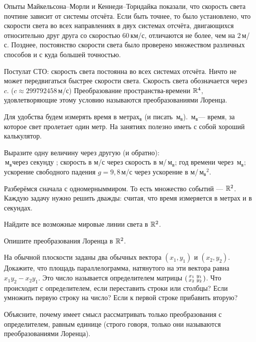 \documentclass[a4paper,12pt]{article}
\newcommand{\smat}[1]{\hr{\begin{smallmatrix}#1\end{smallmatrix}}}
\newcommand{\мв}{\,м$_в$}
\begin{document}

{\tiny
Опыты Майкельсона--Морли и Кеннеди--Торндайка показали, что скорость света  почти не зависит от системы отсчёта. Если быть точнее, то было установлено, что скорости света во всех направлениях в двух системах отсчёта, двигающихся относительно друг друга со скоростью 60\,км/с, отличаются не более, чем на 2\,м/с. Позднее, постоянство скорости света было проверено множеством различных способов и с куда большей точностью.

}{\small
Постулат СТО: скорость света постоянна во всех системах отсчёта. Ничто не может передвигаться быстрее скорости света. Скорость света обозначается через $c$. ($c\approx299 792 458$\,м/с)
Преобразование пространства-времени $\mathbb{R}^4$, удовлетворяющие этому условию называются преобразованиями  Лоренца.

Для удобства будем измерять время в метрах$_в$ (и писать \мв). \мв --- время, за которое свет пролетает один метр. На занятиях полезно иметь с собой хороший калькулятор.

}

Выразите одну величину через другую (и обратно):\\
 \мв через секунду ;
 скорость в м/с через скорость в м/\мв;
 год времени через \мв;\\
 ускорение свободного падения $g=9{,}8$\,м/с через ускорение в м/\мв$^2$.



Разберёмся сначала с  одномерным миром. То есть множество событий --- $\mathbb{R}^2$.
Каждую задачу нужно решить  дважды: считая, что время измеряется в метрах и в секундах.



Найдите все возможные мировые линии света в $\mathbb{R}^2$.


Опишите преобразования Лоренца в $\mathbb{R}^2$.

На обычной плоскости заданы два обычных вектора $(x_1,y_1)$ и $(x_2,y_2)$. Докажите, что площадь параллелограмма, натянутого на эти вектора равна $x_1y_2-x_2y_1$. Это число называется  определителем матрицы $\smat{x_1&y_1\\x_2&y_2}$.
Что происходит с определителем, если переставить строки или столбцы?
Если умножить первую строку на число?
Если к первой строке прибавить вторую?

Объясните, почему имеет смысл рассматривать только преобразования с определителем, равным единице (строго говоря, только они называются преобразованиями Лоренца).
\end{document}
